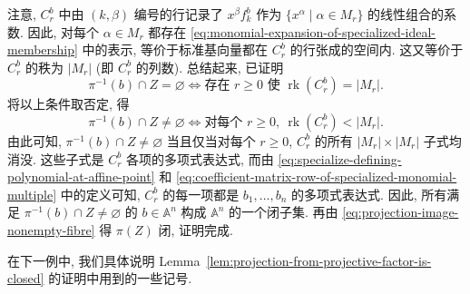 \begin{Proof}
注意, $C_{r}^{b}$ 中由 $(k,\beta)$ 编号的行记录了 $x^{\beta}f_{k}^{b}$ 作为 $\{x^{\alpha}\mid\alpha\in M_{r}\}$ 的线性组合的系数. 因此, 对每个 $\alpha\in M_{r}$ 都存在 \eqref{eq:monomial-expansion-of-specialized-ideal-membership} 中的表示, 等价于标准基向量都在 $C_{r}^{b}$ 的行张成的空间内. 这又等价于 $C_{r}^{b}$ 的秩为 $|M_{r}|$ (即 $C_{r}^{b}$ 的列数). 总结起来, 已证明
\[
  \pi^{-1}(b)\cap Z=\varnothing
  \iff\text{存在 }r\ge0\text{ 使 }\operatorname{rk}(C_{r}^{b})=|M_{r}|.
\]
将以上条件取否定, 得
\[
  \pi^{-1}(b)\cap Z\ne\varnothing
  \iff\text{对每个 }r\ge0,\ \operatorname{rk}(C_{r}^{b})<|M_{r}|.
\]
由此可知, $\pi^{-1}(b)\cap Z\ne\varnothing$ 当且仅当对每个 $r\ge0$, $C_{r}^{b}$ 的所有 $|M_{r}|\times|M_{r}|$ 子式均消没. 这些子式是 $C_{r}^{b}$ 各项的多项式表达式, 而由 \eqref{eq:specialize-defining-polynomial-at-affine-point} 和 \eqref{eq:coefficient-matrix-row-of-specialized-monomial-multiple} 中的定义可知, $C_{r}^{b}$ 的每一项都是 $b_{1},\ldots,b_{n}$ 的多项式表达式. 因此, 所有满足 $\pi^{-1}(b)\cap Z\ne\varnothing$ 的 $b\in\mathbb{A}^{n}$ 构成 $\mathbb{A}^{n}$ 的一个闭子集. 再由 \eqref{eq:projection-image-nonempty-fibre} 得 $\pi(Z)$ 闭, 证明完成.
\end{Proof}

在下一例中, 我们具体说明 Lemma~\ref{lem:projection-from-projective-factor-is-closed} 的证明中用到的一些记号.

